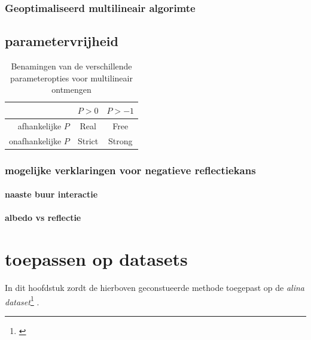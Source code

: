 \documentclass[12pt]{report}
\newcommand{\footcite}[1]{\cite{#1}\let\thefootnote\relax \footnote{\cite{#1} \bibentry{#1}} }
\begin{document}
\subsection{Geoptimaliseerd multilineair algorimte}


\section{parametervrijheid}

\begin{table}
\Large\center
\begin{tabular}{r|c c}
&$P>0$&$P>-1$ \\
\hline
afhankelijke $P$ & Real & Free \\
onafhankelijke $P$ & Strict & Strong
\end{tabular}
\caption{Benamingen van de verschillende parameteropties voor multilineair ontmengen}
\end{table}

\subsection{mogelijke verklaringen voor negatieve reflectiekans}

\subsubsection{naaste buur interactie}

\subsubsection{albedo vs reflectie}

\chapter{toepassen op datasets}

In dit hoofdstuk zordt de hierboven geconstueerde methode toegepast op de \textit{alina dataset}\footcite{alina}.
\end{document}
